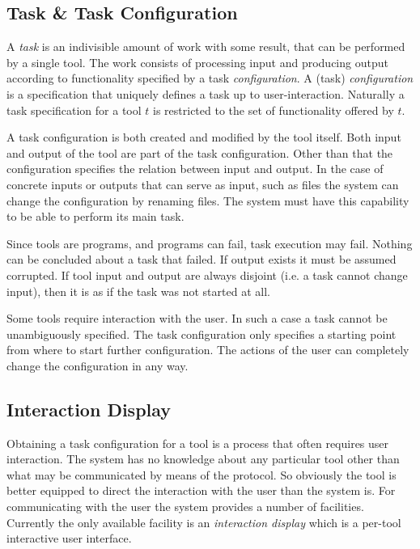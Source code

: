 \documentclass{article}
\begin{document}
  \subsection{Task \& Task Configuration} \label{concepts::task_configuration}

   A \textit{task} is an indivisible amount of work with some result, that can
   be performed by a single tool. The work consists of processing input and
   producing output according to functionality specified by a task \textit{
   configuration}.  A (task) \textit{configuration} is a specification that
   uniquely defines a task up to user-interaction. Naturally a task
   specification for a tool $t$ is restricted to the set of functionality
   offered by $t$.

   A task configuration is both created and modified by the tool itself. Both
   input and output of the tool are part of the task configuration. Other than
   that the configuration specifies the relation between input and output.  In
   the case of concrete inputs or outputs that can serve as input, such as
   files the system can change the configuration by renaming files. The system
   must have this capability to be able to perform its main task.
 
   Since tools are programs, and programs can fail, task execution may fail.
   Nothing can be concluded about a task that failed. If output exists it must
   be assumed corrupted. If tool input and output are always disjoint (i.e. a
   task cannot change input), then it is as if the task was not started at all.

   Some tools require interaction with the user. In such a case a task cannot
   be unambiguously specified. The task configuration only specifies a starting
   point from where to start further configuration. The actions of the user can
   completely change the configuration in any way.

  \subsection{Interaction Display}

   Obtaining a task configuration for a tool is a process that often requires
   user interaction. The system has no knowledge about any particular tool
   other than what may be communicated by means of the protocol. So obviously
   the tool is better equipped to direct the interaction with the user than the
   system is. For communicating with the user the system provides a number of
   facilities. Currently the only available facility is an \textit{interaction
   display} which is a per-tool interactive user interface.
\end{document}
